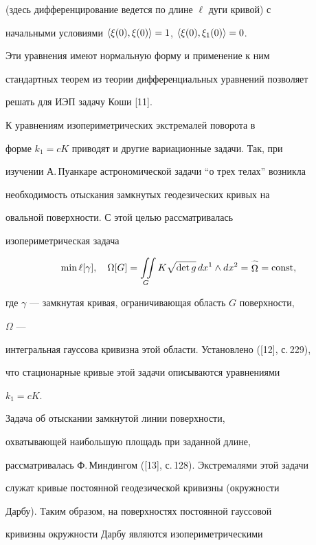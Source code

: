 (здесь дифференцирование ведется по длине $\ell$ дуги кривой) с 


начальными условиями $\langle\xi(0),\xi(0)\rangle=1$, $\langle\xi(0),\xi_1(0)\rangle=0$. 


 


Эти уравнения имеют нормальную форму и применение к ним 


стандартных теорем из теории дифференциальных уравнений позволяет 


решать для ИЭП задачу Коши [11]. 


 


К уравнениям изопериметрических экстремалей поворота в 


форме $k_1=cK$ приводят и другие вариационные задачи. Так, при 


изучении А.\,Пуанкаре астрономической задачи ``о трех телах'' возникла 


необходимость отыскания замкнутых геодезических кривых на 


овальной поверхности. С этой целью рассматривалась 


изопериметрическая задача 


$$ 


\min\ell[\gamma],\quad \Omega[G]=\iint\limits_G 


K\sqrt{\det g}\,dx^1\wedge dx^2=\mymath{\Omega}^\frown=\const, 


$$ 


где $\gamma$ --- замкнутая кривая, ограничивающая область $G$ поверхности, 


$\Omega$ --- 


интегральная гауссова кривизна этой области. Установлено ([12], с.\,229), 


что стационарные кривые этой задачи описываются уравнениями 


$k_1=cK$. 


 


Задача об отыскании замкнутой линии поверхности, 


охватывающей наибольшую площадь при заданной длине, 


рассматривалась Ф.\,Миндингом ([13], с.\,128). Экстремалями этой задачи 


служат кривые постоянной геодезической кривизны (окружности 


Дарбу). Таким образом, на поверхностях постоянной гауссовой 


кривизны окружности Дарбу являются изопериметрическими 



